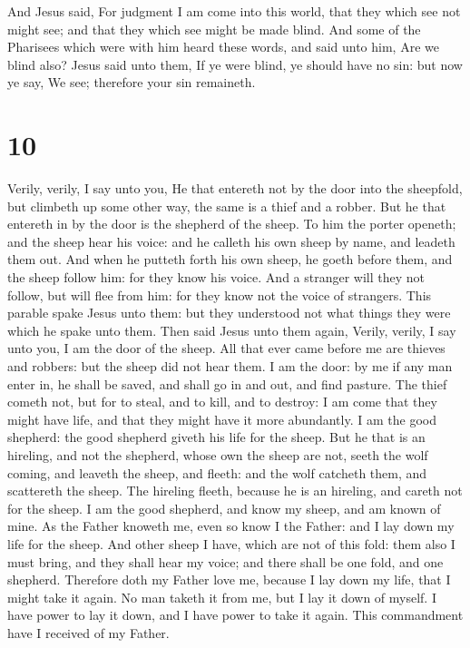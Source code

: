  And Jesus said, For judgment I am come into this world,
that they which see not might see; and that they which see might be made
blind.  And some of the Pharisees which were with him
heard these words, and said unto him, Are we blind also? 
Jesus said unto them, If ye were blind, ye should have no sin: but now
ye say, We see; therefore your sin remaineth.

\hypertarget{section-9}{%
\section{10}\label{section-9}}

 Verily, verily, I say unto you, He that entereth not by
the door into the sheepfold, but climbeth up some other way, the same is
a thief and a robber.  But he that entereth in by the door
is the shepherd of the sheep.  To him the porter openeth;
and the sheep hear his voice: and he calleth his own sheep by name, and
leadeth them out.  And when he putteth forth his own
sheep, he goeth before them, and the sheep follow him: for they know his
voice.  And a stranger will they not follow, but will flee
from him: for they know not the voice of strangers.  This
parable spake Jesus unto them: but they understood not what things they
were which he spake unto them.  Then said Jesus unto them
again, Verily, verily, I say unto you, I am the door of the sheep.
 All that ever came before me are thieves and robbers: but
the sheep did not hear them.  I am the door: by me if any
man enter in, he shall be saved, and shall go in and out, and find
pasture.  The thief cometh not, but for to steal, and to
kill, and to destroy: I am come that they might have life, and that they
might have it more abundantly.  I am the good shepherd:
the good shepherd giveth his life for the sheep.  But he
that is an hireling, and not the shepherd, whose own the sheep are not,
seeth the wolf coming, and leaveth the sheep, and fleeth: and the wolf
catcheth them, and scattereth the sheep.  The hireling
fleeth, because he is an hireling, and careth not for the sheep.
 I am the good shepherd, and know my sheep, and am known
of mine.  As the Father knoweth me, even so know I the
Father: and I lay down my life for the sheep.  And other
sheep I have, which are not of this fold: them also I must bring, and
they shall hear my voice; and there shall be one fold, and one shepherd.
 Therefore doth my Father love me, because I lay down my
life, that I might take it again.  No man taketh it from
me, but I lay it down of myself. I have power to lay it down, and I have
power to take it again. This commandment have I received of my Father.

